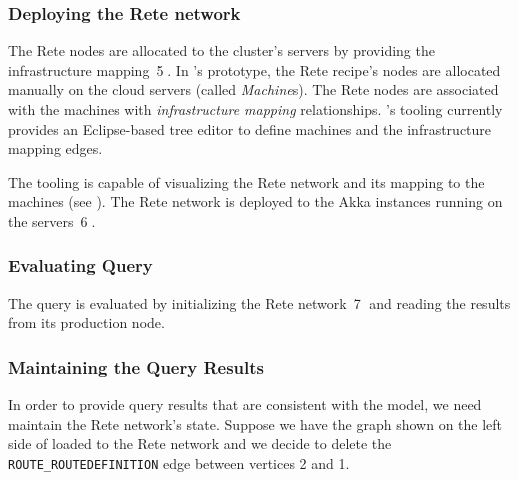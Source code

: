 
\subsubsection{Deploying the Rete network}

The Rete nodes are allocated to the cluster's servers by providing the infrastructure mapping~\textcircled{5}. 
In \iqd{}'s prototype, the Rete recipe's nodes are allocated manually on the cloud servers (called \textit{Machine}s). The Rete nodes are associated with the machines with \textit{infrastructure mapping} relationships. \iqd{}'s tooling currently provides an Eclipse-based tree editor to define machines and the infrastructure mapping edges.%

The tooling is capable of visualizing the Rete network and its mapping to the machines (see ).
The Rete network is deployed to the Akka instances running on the servers~\textcircled{6}.


\subsubsection{Evaluating Query}

The query is evaluated by initializing the Rete network~\textcircled{7} and reading the results from its production node.

\subsubsection{Maintaining the Query Results}

In order to provide query results that are consistent with the model, we need maintain the Rete network's state. Suppose we have the graph shown on the left side of  loaded to the Rete network and we decide to delete the \texttt{ROUTE\_ROUTEDEFINITION} edge between vertices 2 and 1.


